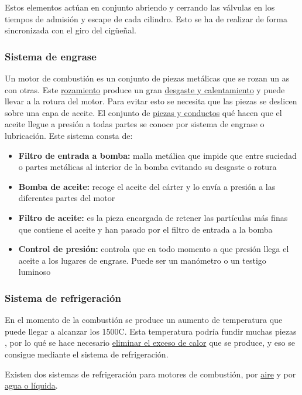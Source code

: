 \documentclass[a4paper,12pt,oneside]{article}
\begin{document}
Estos elementos actúan en conjunto abriendo y cerrando las válvulas en los
tiempos de admisión y escape de cada cilindro. Esto se ha de realizar de forma
sincronizada con el giro del cigüeñal. 

\subsubsection{Sistema de engrase}
\label{sec:org541f0b2}
Un motor de combustión es un conjunto de piezas metálicas que se rozan un as con
otras. Este \uline{rozamiento} produce un gran \uline{desgaste y calentamiento} y puede
llevar a la rotura del motor. Para evitar esto se necesita que las piezas se
deslicen sobre una capa de aceite. El conjunto de \uline{piezas y conductos} qué hacen
que el aceite llegue a presión a todas partes se conoce por sistema de engrase o
lubricación. Este sistema consta de:
\begin{itemize}
\item \textbf{Filtro de entrada a bomba:} malla metálica que impide que entre suciedad o
partes metálicas al interior de la bomba evitando su desgaste o rotura
\item \textbf{Bomba de aceite:} recoge el aceite del cárter y lo envía a presión a las
diferentes partes del motor
\item \textbf{Filtro de aceite:} es la pieza encargada de retener las partículas más finas
que contiene el aceite y han pasado por el filtro de entrada a la bomba
\item \textbf{Control de presión:} controla que en todo momento a que presión llega el
aceite a los lugares de engrase. Puede ser un manómetro o un testigo luminoso
\end{itemize}
\subsubsection{Sistema de refrigeración}
\label{sec:orgddec6c7}
En el momento de la combustión se produce un aumento de temperatura que puede
llegar a alcanzar los 1500\textdegree{}C. Esta temperatura podría fundir muchas
piezas , por lo qué se hace necesario \uline{eliminar el exceso de calor} que se
produce, y eso se consigue mediante el sistema de refrigeración.

Existen dos sistemas de refrigeración para motores de combustión, por \uline{aire} y
por \uline{agua o líquida}. 
\end{document}
